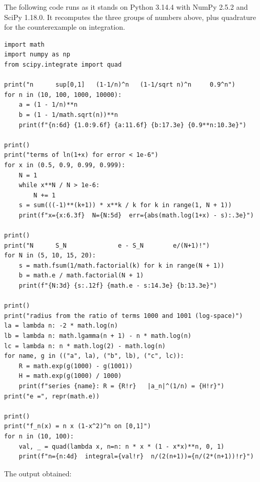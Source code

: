 The following code runs as it stands on Python 3.14.4 with NumPy 2.5.2 and
SciPy 1.18.0. It recomputes the three groups of numbers above, plus
quadrature for the counterexample on integration.

\begin{lab}
\begin{verbatim}
import math
import numpy as np
from scipy.integrate import quad

print("n      sup[0,1]   (1-1/n)^n   (1-1/sqrt n)^n     0.9^n")
for n in (10, 100, 1000, 10000):
    a = (1 - 1/n)**n
    b = (1 - 1/math.sqrt(n))**n
    print(f"{n:6d} {1.0:9.6f} {a:11.6f} {b:17.3e} {0.9**n:10.3e}")

print()
print("terms of ln(1+x) for error < 1e-6")
for x in (0.5, 0.9, 0.99, 0.999):
    N = 1
    while x**N / N > 1e-6:
        N += 1
    s = sum(((-1)**(k+1)) * x**k / k for k in range(1, N + 1))
    print(f"x={x:6.3f}  N={N:5d}  err={abs(math.log(1+x) - s):.3e}")

print()
print("N      S_N              e - S_N        e/(N+1)!")
for N in (5, 10, 15, 20):
    s = math.fsum(1/math.factorial(k) for k in range(N + 1))
    b = math.e / math.factorial(N + 1)
    print(f"{N:3d} {s:.12f} {math.e - s:14.3e} {b:13.3e}")

print()
print("radius from the ratio of terms 1000 and 1001 (log-space)")
la = lambda n: -2 * math.log(n)
lb = lambda n: math.lgamma(n + 1) - n * math.log(n)
lc = lambda n: n * math.log(2) - math.log(n)
for name, g in (("a", la), ("b", lb), ("c", lc)):
    R = math.exp(g(1000) - g(1001))
    H = math.exp(g(1000) / 1000)
    print(f"series {name}: R = {R!r}   |a_n|^(1/n) = {H!r}")
print("e =", repr(math.e))

print()
print("f_n(x) = n x (1-x^2)^n on [0,1]")
for n in (10, 100):
    val, _ = quad(lambda x, n=n: n * x * (1 - x*x)**n, 0, 1)
    print(f"n={n:4d}  integral={val!r}  n/(2(n+1))={n/(2*(n+1))!r}")
\end{verbatim}
\end{lab}

The output obtained:

